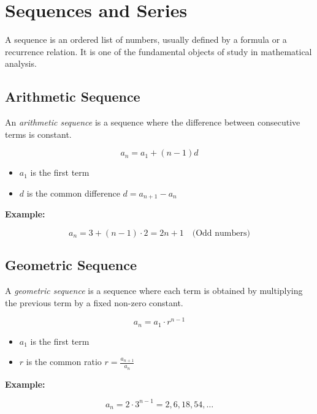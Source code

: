 \newpage
\section{Sequences and Series}

A sequence is an ordered list of numbers, usually defined by a formula or a recurrence relation. It is 
one of the fundamental objects of study in mathematical analysis.

\subsection{Arithmetic Sequence}

An \emph{arithmetic sequence} is a sequence where the difference between consecutive terms is constant.

\[
    a_n = a_1 + (n - 1)d
\]

\begin{itemize}

    \item \(a_1\) is the first term

    \item \(d\) is the common difference \(d = a_{n + 1} - a_{n}\)

\end{itemize}

\textbf{Example:}

\[
    a_n = 3 + (n - 1) \cdot 2 = 2n + 1 \quad \text{(Odd numbers)}
\]

\subsection{Geometric Sequence}

A \emph{geometric sequence} is a sequence where each term is obtained by multiplying the previous term 
by a fixed non-zero constant.

\[
    a_n = a_1 \cdot r^{n-1}
\]

\begin{itemize}

    \item \(a_1\) is the first term

    \item \(r\) is the common ratio \(r = \frac{a_{n + 1}}{a_n}\)

\end{itemize}

\textbf{Example:}

\[
    a_n = 2 \cdot 3^{n-1} = 2, 6, 18, 54, \dots
\]

